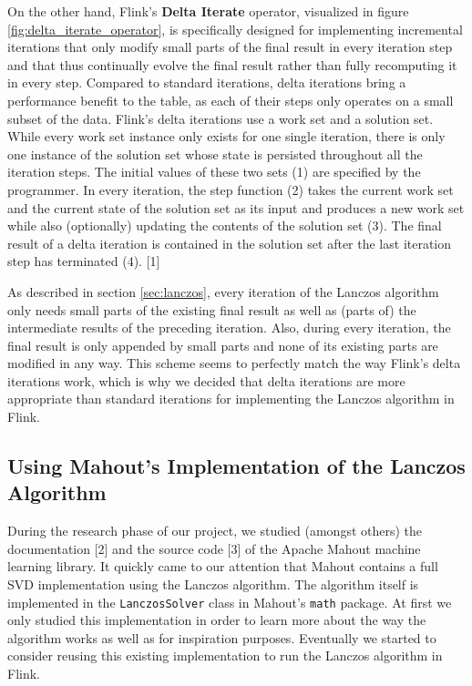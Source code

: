 On the other hand, Flink's \textbf{Delta Iterate} operator, visualized in figure 
\ref{fig:delta_iterate_operator}, is specifically designed for implementing incremental
iterations that only modify small parts of the final result in every iteration step and that 
thus continually evolve the final result rather than fully recomputing it in every step.
Compared to standard iterations, delta iterations bring a performance benefit to the table,
as each of their steps only operates on a small subset of the data. Flink's delta iterations
use a work set and a solution set. While every work set instance only exists for one single
iteration, there is only one instance of the solution set whose state is persisted throughout 
all the iteration steps. The initial values of these two sets (1) are specified by the 
programmer. In every iteration, the step function (2) takes the current work set and the current
state of the solution set as its input and produces a new work set while also (optionally)
updating the contents of the solution set (3). The final result of a delta iteration is
contained in the solution set after the last iteration step has terminated (4). [1]


As described in section \ref{sec:lanczos}, every iteration of the Lanczos algorithm only needs
small parts of the existing final result as well as (parts of) the intermediate results of the
preceding iteration. Also, during every iteration, the final result is only appended by small
parts and none of its existing parts are modified in any way. This scheme seems to perfectly
match the way Flink's delta iterations work, which is why we decided that delta iterations are
more appropriate than standard iterations for implementing the Lanczos algorithm in Flink.



\subsection{Using Mahout's Implementation of the Lanczos Algorithm}

During the research phase of our project, we studied (amongst others) the documentation [2]
and the source code [3] of the Apache Mahout machine learning library. It quickly came to our
attention that Mahout contains a full SVD implementation using the Lanczos algorithm. The
algorithm itself is implemented in the \texttt{LanczosSolver} class in Mahout's \texttt{math}
package. At first we only studied this implementation in order to learn more about the way the
algorithm works as well as for inspiration purposes. Eventually we started to consider reusing
this existing implementation to run the Lanczos algorithm in Flink.

